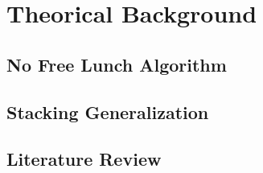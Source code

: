 \chapter{Theorical Background}


\section{No Free Lunch Algorithm}

\lipsum[2-3]

\section{Stacking Generalization}

\lipsum[2-3]

\section{Literature Review}

\lipsum[2-3]